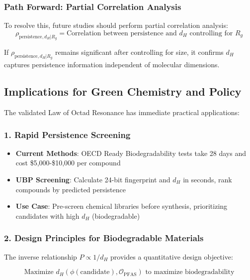 \documentclass[11pt,letterpaper]{article}
\begin{document}
\subsubsection{Path Forward: Partial Correlation Analysis}

To resolve this, future studies should perform partial correlation analysis:
\begin{equation}
\rho_{\text{persistence}, d_H | R_g} = \text{Correlation between persistence and } d_H \text{ controlling for } R_g
\end{equation}

If $\rho_{\text{persistence}, d_H | R_g}$ remains significant after controlling for size, it confirms $d_H$ captures persistence information independent of molecular dimensions.

\subsection{Implications for Green Chemistry and Policy}

The validated Law of Octad Resonance has immediate practical applications:

\subsubsection{1. Rapid Persistence Screening}

\begin{itemize}
    \item \textbf{Current Methods}: OECD Ready Biodegradability tests take 28 days and cost \$5,000-\$10,000 per compound \cite{OECD301}
    \item \textbf{UBP Screening}: Calculate 24-bit fingerprint and $d_H$ in seconds, rank compounds by predicted persistence
    \item \textbf{Use Case}: Pre-screen chemical libraries before synthesis, prioritizing candidates with high $d_H$ (biodegradable)
\end{itemize}

\subsubsection{2. Design Principles for Biodegradable Materials}

The inverse relationship $P \propto 1/d_H$ provides a quantitative design objective:

\begin{equation}
\text{Maximize } d_H(\phi(\text{candidate}), \mathcal{O}_{\text{PFAS}}) \text{ to maximize biodegradability}
\end{equation}
\end{document}
